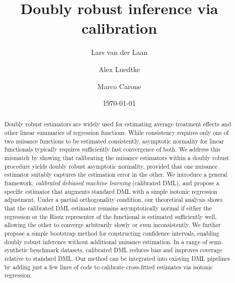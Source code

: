 \documentclass[11pt]{article}
\title{Doubly robust inference via calibration}
\date{\today}
\author[1]{Lars van der Laan}
\author[1,2]{Alex Luedtke}
\author[2,1]{Marco Carone}
\affil[1]{\footnotesize Department of Statistics, University of Washington, Seattle, USA}
\affil[2]{\footnotesize Department of Biostatistics, University of Washington, Seattle, USA}
\theoremstyle{plain}
\begin{document}
\allowdisplaybreaks
\maketitle

 

\singlespacing

\begin{abstract}
 
Doubly robust estimators are widely used for estimating average treatment effects and other linear summaries of regression functions. While consistency requires only one of two nuisance functions to be estimated consistently, asymptotic normality for linear functionals typically requires sufficiently fast convergence of both. We address this mismatch by showing that calibrating the nuisance
estimators within a doubly robust procedure yields doubly robust asymptotic
normality, provided that one nuisance estimator suitably captures the estimation error in
the other. We introduce a general framework, \emph{calibrated debiased machine learning} (calibrated DML), and propose a specific estimator that augments standard DML with a simple isotonic regression adjustment. Under a partial orthogonality condition, our theoretical analysis shows that the calibrated DML estimator remains asymptotically normal if either the regression or the Riesz representer of the functional is estimated sufficiently well, allowing the other to converge arbitrarily slowly or even inconsistently. We further propose a simple bootstrap method for constructing confidence intervals, enabling doubly robust inference without additional nuisance estimation. In a range of semi-synthetic benchmark datasets, calibrated DML reduces bias and improves coverage relative to standard DML.  Our method can be integrated into existing DML pipelines by adding just a few lines of code to calibrate cross-fitted estimates via isotonic regression.  

 


\end{abstract}
\end{document}
